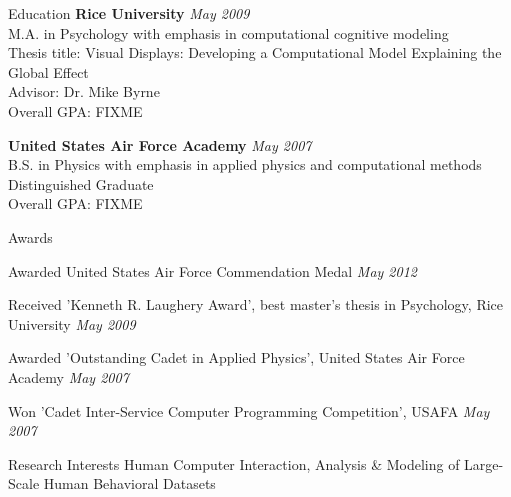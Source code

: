 \documentclass{resume} %
\begin{document}

\begin{rSection}{Education}
{\bf Rice University} \hfill {\em May 2009} \\ 
M.A. in Psychology with emphasis in computational cognitive modeling \\
Thesis title: Visual Displays: Developing a Computational Model Explaining the Global Effect \\
Advisor: Dr. Mike Byrne \\
Overall GPA: FIXME 

{\bf United States Air Force Academy} \hfill {\em May 2007} \\ 
B.S. in Physics with emphasis in applied physics and computational methods \\
Distinguished Graduate \\
Overall GPA: FIXME
\end{rSection}


\begin{rSection}{Awards}
\item Awarded United States Air Force Commendation Medal \hfill {\em May 2012}
\item Received 'Kenneth R. Laughery Award', best master’s thesis in Psychology, Rice University \hfill {\em May 2009}
\item Awarded 'Outstanding Cadet in Applied Physics', United States Air Force Academy \hfill {\em May 2007}
\item Won 'Cadet Inter-Service Computer Programming Competition', USAFA \hfill {\em May 2007}
\end{rSection}

\begin{rSection}{Research Interests}
Human Computer Interaction, Analysis \& Modeling of Large-Scale Human Behavioral Datasets
\end{rSection}

\end{document}
